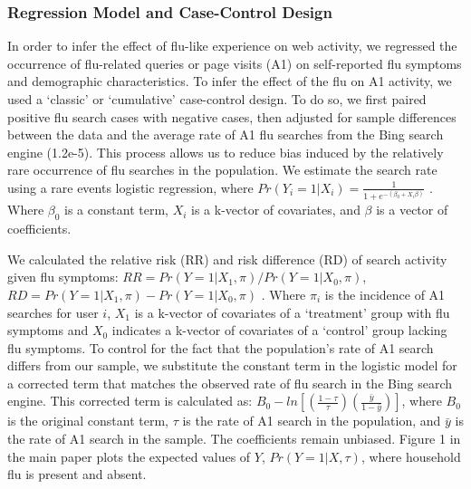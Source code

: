 \documentclass[12pt]{article}
\begin{document}


\subsubsection{Regression Model and Case-Control Design}

In order to infer the effect of flu-like experience on web activity, we regressed the occurrence of flu-related queries or page visits (A1) on self-reported flu symptoms and demographic characteristics. To infer the effect of the flu on A1 activity, we used a `classic' or `cumulative' case-control design. To do so, we first paired positive flu search cases with negative cases, then adjusted for sample differences between the data and the average rate of A1 flu searches from the Bing search engine (1.2e-5). This process allows us to reduce bias induced by the relatively rare occurrence of flu searches in the population. We estimate the search rate using a rare events logistic regression, where $Pr(Y_i=1|X_i) = \frac{1}{1+e^{ - (\beta_0 + X_i \beta ) }}$ . Where $\beta_0$ is a constant term, $X_i$ is a k-vector of covariates, and $\beta$ is a vector of coefficients. 

We calculated the relative risk (RR) and risk difference (RD) of search activity given flu symptoms: $ RR = Pr(Y=1|X_1, \pi) / Pr(Y=1|X_0, \pi) $, $ RD = Pr(Y=1|X_1, \pi) - Pr(Y=1|X_0, \pi) $ \citep{king_and_zeng_2001}. Where $\pi_i$ is the incidence of A1 searches for user $i$, $X_1$ is a k-vector of covariates of a `treatment' group with flu symptoms and $X_0$ indicates a k-vector of covariates of a `control' group lacking flu symptoms. To control for the fact that the population's rate of A1 search differs from our sample, we substitute the constant term in the logistic model for a corrected term that matches the observed rate of flu search in the Bing search engine. This corrected term is calculated as: $B_0 - ln[ (\frac{1-\tau}{\tau}) (\frac{\bar{y}}{1-\bar{y}}) ]$, where $B_0$ is the original constant term, $\tau$ is the rate of A1 search in the population, and $\bar{y}$ is the rate of A1 search in the sample. The coefficients remain unbiased. Figure 1 in the main paper plots the expected values of $Y$, $Pr(Y=1|X, \tau)$, where household flu is present and absent.
\end{document}

